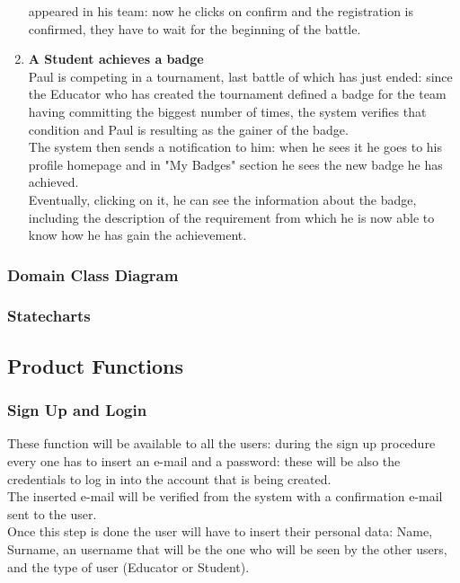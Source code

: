 \documentclass{article}
\begin{document}
\begin{enumerate}
  appeared in his team: now he clicks on confirm and the registration is confirmed, they have to wait for the beginning of the battle.
  \newpage 
  \item \textbf{A Student achieves a badge\\} Paul is competing in a tournament, last battle of which has just ended: since the Educator who has created the tournament defined a badge for the team 
  having committing the biggest number of times, the system verifies that condition and Paul is resulting as the gainer of the badge.\\
  The system then sends a notification to him: when he sees it he goes to his profile homepage and in "My Badges" section he sees the new badge he has achieved.\\
  Eventually, clicking on it, he can see the information about the badge, including the description of the requirement from which he is now able to know
  how he has gain the achievement.


\end{enumerate}

\subsubsection{Domain Class Diagram}
\subsubsection{Statecharts}
\subsection{Product Functions}
\subsubsection{Sign Up and Login}
These function will be available to all the users: during the sign up procedure every one has to insert an e-mail and a password: these will be also the credentials to log in into the account that is being created.\\
The inserted e-mail will be verified from the system with a confirmation e-mail sent to the user.\\
Once this step is done the user will have to insert their personal data: Name, Surname, an username that will be the one who will be seen by the other users, and the type of user (Educator or Student).
\end{document}
